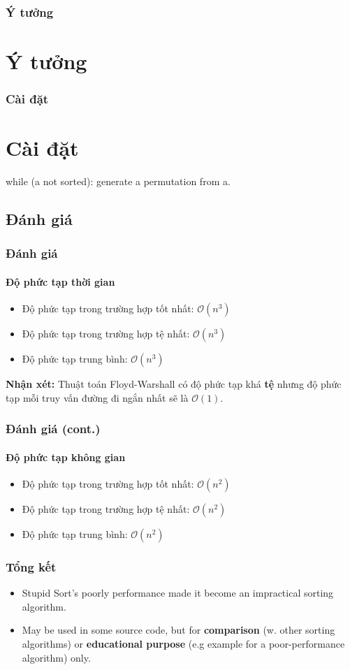 \documentclass[12pt]{beamer}
\begin{document}
    \begin{frame}[t]
        \frametitle{Ý tưởng}
        \section{Ý tưởng}

    \end{frame}

    \begin{frame}[t]
        \frametitle{Cài đặt}
        \section{Cài đặt}
        while (a not sorted):
            generate a permutation from a.
    \end{frame}

    \begin{frame}[t]
        \section{Đánh giá}
        \frametitle{Đánh giá}
        \framesubtitle{Độ phức tạp thời gian}
        \begin{itemize}
            \item Độ phức tạp trong trường hợp tốt nhất: $\mathcal{O}(n^3)$
            \item Độ phức tạp trong trường hợp tệ nhất: $\mathcal{O}(n^3)$
            \item Độ phức tạp trung bình: $\mathcal{O}(n^3)$
        \end{itemize}
        \textbf{Nhận xét:} Thuật toán Floyd-Warshall có độ phức tạp khá \textbf{tệ} nhưng độ phức tạp mỗi truy vấn đường đi ngắn nhất sẽ là $\mathcal{O}(1)$.
    \end{frame}

    \begin{frame}[t]
        \frametitle{Đánh giá (cont.)}
        \framesubtitle{Độ phức tạp không gian}
        \begin{itemize}
            \item Độ phức tạp trong trường hợp tốt nhất: $\mathcal{O}(n^2)$
            \item Độ phức tạp trong trường hợp tệ nhất: $\mathcal{O}(n^2)$
            \item Độ phức tạp trung bình: $\mathcal{O}(n^2)$
        \end{itemize}
    \end{frame}

    \begin{frame}
        \frametitle{Tổng kết}
        \begin{itemize}
            \item Stupid Sort's poorly performance made it become an impractical sorting algorithm.
            \item May be used in some source code, but for \textbf{comparison} (w. other sorting algorithms) or \textbf{educational purpose} (e.g example for a poor-performance algorithm) only.
        \end{itemize}
    \end{frame}
\end{document}
